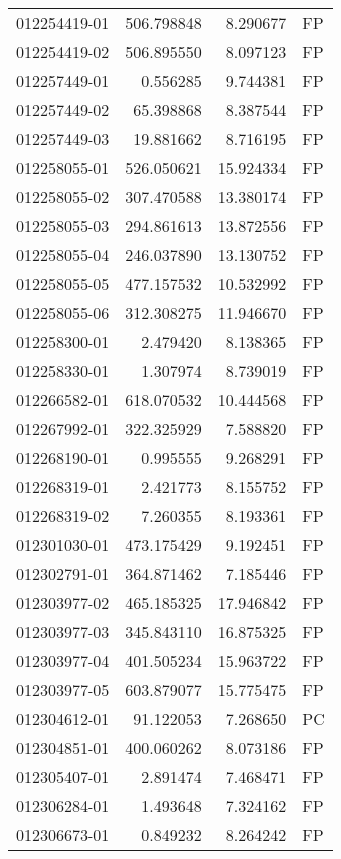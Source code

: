 \begin{tabular}{lrrl}
012254419-01 &  506.798848 &     8.290677 &   FP \\
012254419-02 &  506.895550 &     8.097123 &   FP \\
012257449-01 &    0.556285 &     9.744381 &   FP \\
012257449-02 &   65.398868 &     8.387544 &   FP \\
012257449-03 &   19.881662 &     8.716195 &   FP \\
012258055-01 &  526.050621 &    15.924334 &   FP \\
012258055-02 &  307.470588 &    13.380174 &   FP \\
012258055-03 &  294.861613 &    13.872556 &   FP \\
012258055-04 &  246.037890 &    13.130752 &   FP \\
012258055-05 &  477.157532 &    10.532992 &   FP \\
012258055-06 &  312.308275 &    11.946670 &   FP \\
012258300-01 &    2.479420 &     8.138365 &   FP \\
012258330-01 &    1.307974 &     8.739019 &   FP \\
012266582-01 &  618.070532 &    10.444568 &   FP \\
012267992-01 &  322.325929 &     7.588820 &   FP \\
012268190-01 &    0.995555 &     9.268291 &   FP \\
012268319-01 &    2.421773 &     8.155752 &   FP \\
012268319-02 &    7.260355 &     8.193361 &   FP \\
012301030-01 &  473.175429 &     9.192451 &   FP \\
012302791-01 &  364.871462 &     7.185446 &   FP \\
012303977-02 &  465.185325 &    17.946842 &   FP \\
012303977-03 &  345.843110 &    16.875325 &   FP \\
012303977-04 &  401.505234 &    15.963722 &   FP \\
012303977-05 &  603.879077 &    15.775475 &   FP \\
012304612-01 &   91.122053 &     7.268650 &   PC \\
012304851-01 &  400.060262 &     8.073186 &   FP \\
012305407-01 &    2.891474 &     7.468471 &   FP \\
012306284-01 &    1.493648 &     7.324162 &   FP \\
012306673-01 &    0.849232 &     8.264242 &   FP \\

\end{tabular}
